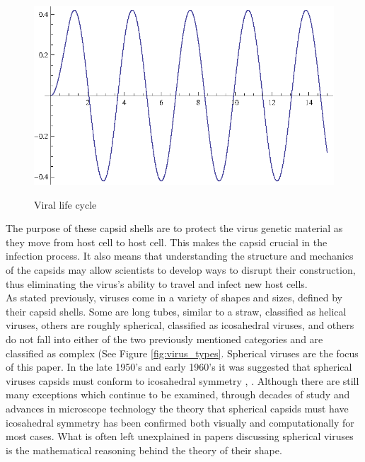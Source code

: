 \documentclass[12pt,letter]{article}
\begin{document}
\begin{figure}[h]
	\caption{Viral life cycle}
	\centering
	\includegraphics{place_holder.eps}
	\label{fig:life_cycle}
\end{figure}
	

The purpose of these capsid shells are to protect the virus genetic material as they move from host cell to host cell. This makes the capsid crucial in the infection process. It also means that understanding the structure and mechanics of the capsids may allow scientists to develop ways to disrupt their construction, thus eliminating the virus's ability to travel and infect new host cells. \\

As stated previously, viruses come in a variety of shapes and sizes, defined by their capsid shells. Some are long tubes, similar to a straw, classified as helical viruses, others are roughly spherical, classified as icosahedral viruses, and others do not fall into either of the two previously mentioned categories and are classified as complex (See Figure \ref{fig:virus_types}. Spherical viruses are the focus of this paper. In the late 1950's and early 1960's it was suggested that spherical viruses capsids must conform to icosahedral symmetry \cite{Crick:1956}, \cite{Caspar:1962}. Although there are still many exceptions which continue to be examined, through decades of study and advances in microscope technology the theory that spherical capsids must have icosahedral symmetry has been confirmed both visually and computationally for most cases. What is often left unexplained in papers discussing spherical viruses is the mathematical reasoning behind the theory of their shape.\\
\end{document}
